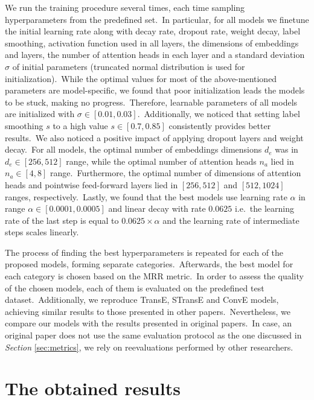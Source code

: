 \documentclass[longabstract, english, mgr]{iithesis}
\theoremstyle{default_theorem_style}\newtheorem{theorem}{Theorem}
\theoremstyle{default_theorem_style}\newtheorem{definition}{Definition}
\begin{document}
\noindent We run the training procedure several times, each time sampling hyperparameters
from the predefined set.\ In particular, for all models we finetune the initial learning rate along
with decay rate, dropout rate, weight decay, label smoothing, activation function used in all layers, the dimensions
of embeddings and layers, the number of attention heads in each layer and a standard deviation $\sigma$ of initial
parameters (truncated normal distribution is used for initialization).\ While the optimal values for most of
the above-mentioned parameters are model-specific, we found that poor initialization leads the models to be stuck,
making no progress.\ Therefore, learnable parameters of all models are initialized with
$\sigma \in [0.01, 0.03]$.\ Additionally, we noticed that setting label smoothing $s$ to a high value
$s \in [0.7, 0.85]$ consistently provides better results.\ We also noticed a positive impact of applying dropout layers
and weight decay.\ For all models, the optimal number of embeddings dimensions $d_e$ was in $d_e \in [256, 512]$ range,
while the optimal number of attention heads $n_a$ lied in $n_a \in [4, 8]$ range.\ Furthermore, the optimal number of
dimensions of attention heads and pointwise feed-forward layers lied in $[256, 512]$ and $[512, 1024]$ ranges,
respectively.\ Lastly, we found that the best models use learning rate $\alpha$ in range $\alpha \in [0.0001, 0.0005]$
and linear decay with rate $0.0625$ i.e.\ the learning rate of the last step is equal to $0.0625\times \alpha$ and the
learning rate of intermediate steps scales linearly.\newline

\noindent The process of finding the best hyperparameters is repeated for each of the proposed models, forming separate
categories.\ Afterwards, the best model for each category is chosen based on the MRR metric.\ In order to assess the
quality of the chosen models, each of them is evaluated on the predefined test dataset.\ Additionally, we reproduce
TransE, STransE and ConvE models, achieving similar results to those presented in other papers.\ Nevertheless, we
compare our models with the results presented in original papers.\ In case, an original paper does not use the same
evaluation protocol as the one discussed in \textit{Section} \ref{sec:metrics}, we rely on reevaluations performed by
other researchers.

\section{The obtained results}
\end{document}
